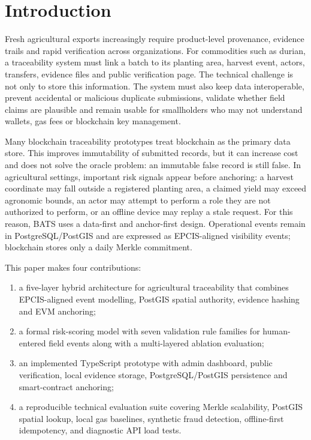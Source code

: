 \documentclass[runningheads]{llncs}
\begin{document}
\section{Introduction}

Fresh agricultural exports increasingly require product-level provenance, evidence trails and rapid verification across organizations. For commodities such as durian, a traceability system must link a batch to its planting area, harvest event, actors, transfers, evidence files and public verification page. The technical challenge is not only to store this information. The system must also keep data interoperable, prevent accidental or malicious duplicate submissions, validate whether field claims are plausible and remain usable for smallholders who may not understand wallets, gas fees or blockchain key management.

Many blockchain traceability prototypes treat blockchain as the primary data store. This improves immutability of submitted records, but it can increase cost and does not solve the oracle problem: an immutable false record is still false. In agricultural settings, important risk signals appear before anchoring: a harvest coordinate may fall outside a registered planting area, a claimed yield may exceed agronomic bounds, an actor may attempt to perform a role they are not authorized to perform, or an offline device may replay a stale request. For this reason, BATS uses a data-first and anchor-first design. Operational events remain in PostgreSQL/PostGIS and are expressed as EPCIS-aligned visibility events; blockchain stores only a daily Merkle commitment.

This paper makes four contributions:
\begin{enumerate}
    \item a five-layer hybrid architecture for agricultural traceability that combines EPCIS-aligned event modelling, PostGIS spatial authority, evidence hashing and EVM anchoring;
    \item a formal risk-scoring model with seven validation rule families for human-entered field events along with a multi-layered ablation evaluation;
    \item an implemented TypeScript prototype with admin dashboard, public verification, local evidence storage, PostgreSQL/PostGIS persistence and smart-contract anchoring;
    \item a reproducible technical evaluation suite covering Merkle scalability, PostGIS spatial lookup, local gas baselines, synthetic fraud detection, offline-first idempotency, and diagnostic API load tests.
\end{enumerate}
\end{document}
